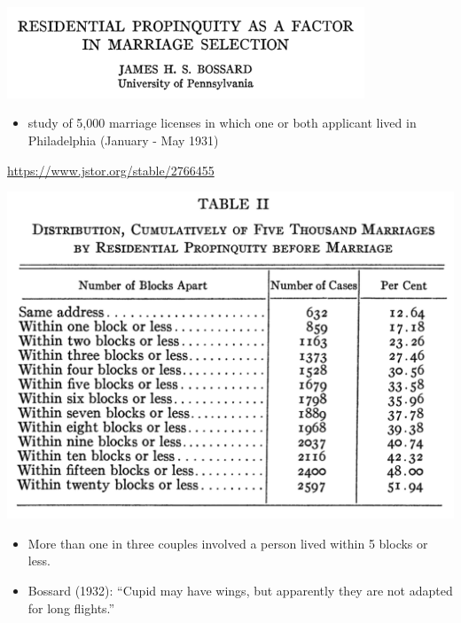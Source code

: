 \documentclass{beamer}
\begin{document}
\begin{frame}

\begin{center}
 \includegraphics[width=0.8\textwidth]{figures/bossard_residential_1932_title}
\end{center}

\begin{itemize}
\item study of 5,000 marriage licenses in which one or both applicant lived in Philadelphia (January - May 1931)
\end{itemize}

\vfill
\url{https://www.jstor.org/stable/2766455 }

\end{frame}
\begin{frame}

\begin{center}
 \includegraphics[height=0.7\textheight]{figures/bossard_residential_1932_tab2}
\end{center}

\begin{itemize}
\item More than one in three couples involved a person lived within 5 blocks or less. 
\pause
\item Bossard (1932): ``Cupid may have wings, but apparently they are not adapted for long flights.''
\end{itemize}


\end{frame}
\end{document}
